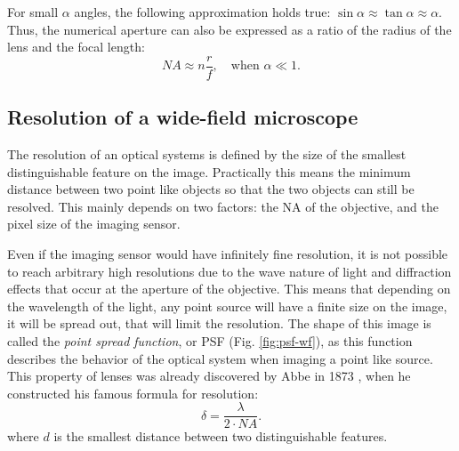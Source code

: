     For small $\alpha$ angles, the following approximation holds true: $\sin \alpha \approx \tan \alpha \approx \alpha$. Thus, the numerical aperture can also be expressed as a ratio of the radius of the lens and the focal length:
    \begin{equation}
      NA \approx n \frac{r}{f},\quad \text{when }\alpha \ll 1.
    \end{equation}



  \subsection{Resolution of a wide-field microscope}
    The resolution of an optical systems is defined by the size of the smallest distinguishable feature on the image. Practically this means the minimum distance between two point like objects so that the two objects can still be resolved. This mainly depends on two factors: the NA of the objective, and the pixel size of the imaging sensor.

    Even if the imaging sensor would have infinitely fine resolution, it is not possible to reach arbitrary high resolutions due to the wave nature of light and diffraction effects that occur at the aperture of the objective. This means that depending on the wavelength of the light, any point source will have a finite size on the image, it will be spread out, that will limit the resolution. The shape of this image is called the \textit{point spread function}, or PSF (Fig. \ref{fig:psf-wf}), as this function describes the behavior of the optical system when imaging a point like source. This property of lenses was already discovered by Abbe in 1873 \cite{abbe_beitrage_1873}, when he constructed his famous formula for resolution:
    \begin{equation}
      \delta = \frac{\lambda}{2 \cdot NA}.
      \label{eq:abbe}
    \end{equation}
    where $d$ is the smallest distance between two distinguishable features.

